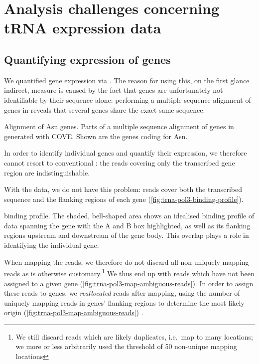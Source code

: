 \chapter{Analysis challenges concerning tRNA expression data}

\section{Quantifying expression of \trna genes}

We quantified \trna gene expression via  \chipseq. The reason for using
this, on the first glance indirect, measure is caused by the fact that \trna
genes are unfortunately not identifiable by their sequence alone: performing a
multiple sequence alignment of \trna genes in \mmu reveals that several \trna
genes share the exact same sequence.

    {\footnotesize}
    {Alignment of Asn \trna genes.}
    {Parts of a multiple sequence alignment of \trna genes in \mmu generated
    with COVE\@. Shown are the \trna genes coding for Asn.}

In order to identify individual \trna genes and quantify their expression, we
therefore cannot resort to conventional \rnaseq: the \rna reads covering only
the transcribed gene region are indistinguishable.

With the  \chipseq data, we do not have this problem: reads cover both the
transcribed sequence and the flanking regions of each gene
(\cref{fig:trna-pol3-binding-profile}).

    {\trna {} \chip binding profile.}
    {The shaded, bell-shaped area shows an idealised binding profile of \chipseq
    data spanning the \trna gene with the A and B box highlighted, as well as
    its flanking regions upstream and downstream of the gene body. This overlap
    plays a role in identifying the individual gene.}

When mapping the reads, we therefore do not discard all non-uniquely mapping
reads as is otherwise customary.\footnote{We still discard reads which are
likely \pcr duplicates, i.e.\ map to many locations; we more or less arbitrarily
used the threshold of \num{50} non-unique mapping locations} We thus end up with
reads which have not been assigned to a given \trna gene
(\cref{fig:trna-pol3-map-ambiguous-reads}). In order to assign these reads to
\trna genes, we \emph{reallocated} reads after mapping, using the number of
uniquely mapping reads in \trna genes’ flanking regions to determine the most
likely origin (\cref{fig:trna-pol3-map-ambiguous-reads}) \citep{Kutter:2011}.

